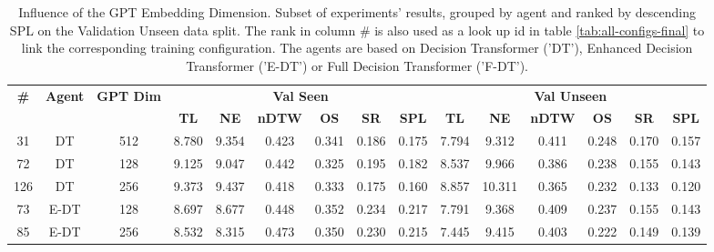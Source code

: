 \begin{table}
\centering
\caption{\label{tab:dim_test}Influence of the GPT Embedding Dimension. Subset of experiments' results, grouped by agent and ranked by descending SPL on the Validation Unseen data split. The rank in column \# is also used as a look up id in table \ref{tab:all-configs-final} to link the corresponding training configuration.     \newline The agents are based on Decision Transformer ('DT'), Enhanced Decision Transformer ('E-DT') or Full Decision Transformer ('F-DT').}
\begin{tabular}{@{\hskip3pt}c@{\hskip3pt}c@{\hskip3pt}c@{\hskip3pt}c@{\hskip3pt}c@{\hskip3pt}c@{\hskip3pt}c@{\hskip3pt}c@{\hskip3pt}c@{\hskip3pt}c@{\hskip3pt}c@{\hskip3pt}c@{\hskip3pt}c@{\hskip3pt}c@{\hskip3pt}c}
\toprule
\textbf{\#} & \textbf{Agent} & \textbf{GPT Dim} & \multicolumn{6}{c}{\textbf{Val Seen}} & \multicolumn{6}{c}{\textbf{Val Unseen}} \\
\cmidrule(l){4-9} \cmidrule(l){10-15} \textbf{~} &     \textbf{~} &       \textbf{~} &       \textbf{TL} & \textbf{NE} & \textbf{nDTW} & \textbf{OS} & \textbf{SR} & \textbf{SPL} &         \textbf{TL} & \textbf{NE} & \textbf{nDTW} & \textbf{OS} & \textbf{SR} & \textbf{SPL} \\
\midrule
         31 &             DT &              512 &             8.780 &       9.354 &         0.423 &       0.341 &       0.186 &        0.175 &               7.794 &       9.312 &         0.411 &       0.248 &       0.170 &        0.157 \\
         72 &             DT &              128 &             9.125 &       9.047 &         0.442 &       0.325 &       0.195 &        0.182 &               8.537 &       9.966 &         0.386 &       0.238 &       0.155 &        0.143 \\
        126 &             DT &              256 &             9.373 &       9.437 &         0.418 &       0.333 &       0.175 &        0.160 &               8.857 &      10.311 &         0.365 &       0.232 &       0.133 &        0.120 \\
         73 &           E-DT &              128 &             8.697 &       8.677 &         0.448 &       0.352 &       0.234 &        0.217 &               7.791 &       9.368 &         0.409 &       0.237 &       0.155 &        0.143 \\
         85 &           E-DT &              256 &             8.532 &       8.315 &         0.473 &       0.350 &       0.230 &        0.215 &               7.445 &       9.415 &         0.403 &       0.222 &       0.149 &        0.139 \\

\end{tabular}
\end{table}
